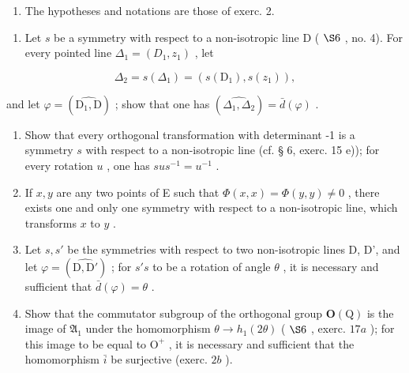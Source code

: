 \begin{enumerate}
\end{enumerate}

\begin{enumerate}
\def\labelenumi{\arabic{enumi})}
\setcounter{enumi}{2}
\tightlist
\item
  The hypotheses and notations are those of exerc. 2.
\end{enumerate}

\begin{enumerate}
\def\labelenumi{\alph{enumi})}
\tightlist
\item
  Let \(s\) be a symmetry with respect to a non-isotropic line D ( \(\S 6\) , no. 4). For every pointed line \(\Delta_{1} = (D_{1}, z_{1})\) , let
\end{enumerate}

\[
\Delta_ {2} = s (\Delta_ {1}) = (s (\mathrm{D} _ {1}), s (z _ {1})),
\]

and let \(\varphi = (\widehat{\mathrm{D}_1, \mathrm{D}})\) ; show that one has \((\widehat{\Delta_1, \Delta_2}) = \bar{d}(\varphi)\) .

\begin{enumerate}
\def\labelenumi{\alph{enumi})}
\setcounter{enumi}{1}
\item
  Show that every orthogonal transformation with determinant -1 is a symmetry \(s\) with respect to a non-isotropic line (cf. § 6, exerc. 15 e)); for every rotation \(u\) , one has \(sus^{-1} = u^{-1}\) .
\item
  If \(x, y\) are any two points of E such that \(\Phi(x, x) = \Phi(y, y) \neq 0\) , there exists one and only one symmetry with respect to a non-isotropic line, which transforms \(x\) to \(y\) .
\item
  Let \(s, s'\) be the symmetries with respect to two non-isotropic lines D, D', and let \(\varphi = (\widehat{\mathrm{D},\mathrm{D}'})\) ; for \(s's\) to be a rotation of angle \(\theta\) , it is necessary and sufficient that \(\bar{d}(\varphi) = \theta\) .
\item
  Show that the commutator subgroup of the orthogonal group \(\mathbf{O}(\mathrm{Q})\) is the image of \(\mathfrak{A}_{1}\) under the homomorphism \(\theta \to h_{1}(2\theta)\) ( \(\S 6\) , exerc. \(17a\) ); for this image to be equal to \(\mathrm{O}^{+}\) , it is necessary and sufficient that the homomorphism \(\bar{i}\) be surjective (exerc. \(2b\) ).
\end{enumerate}

